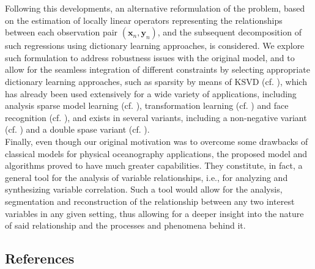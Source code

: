 \documentclass[10pt]{extarticle}
\begin{document}
Following this developments, an alternative reformulation of the problem, based on the estimation of locally linear operators representing the relationships between each observation pair $(\mathbf{x}_n,\mathbf{y}_n)$, and the subsequent decomposition of such regressions using dictionary learning approaches, is considered. We explore such formulation to address robustness issues with the original model, and to allow for the seamless integration of different constraints by selecting appropriate dictionary learning approaches, such as sparsity by means of KSVD (cf. \cite{aharon,Rubinstein}), which has already been used extensively for a wide variety of applications, including analysis sparse model learning (cf. \cite{aksvd}), transformation learning (cf. \cite{tksvd}) and face recognition (cf. \cite{fksvd}), and exists in several variants, including a non-negative variant (cf. \cite{nnksvd}) and a double spase variant (cf. \cite{double_sparse}).\\
Finally, even though our original motivation was to overcome some drawbacks of classical models for physical oceanography applications, the proposed model and algorithms proved to have much greater capabilities. They constitute, in fact, a general tool for the analysis of variable relationships, i.e., for analyzing and synthesizing variable correlation. Such a tool would allow for the analysis, segmentation and reconstruction of the relationship between any two interest variables in any given setting, thus allowing for a deeper insight into the nature of said relationship and the processes and phenomena behind it.

\begin{small}
\section*{References}
\renewcommand{\refname}{}
\vspace{-0.8cm}


\end{small}
\end{document}
